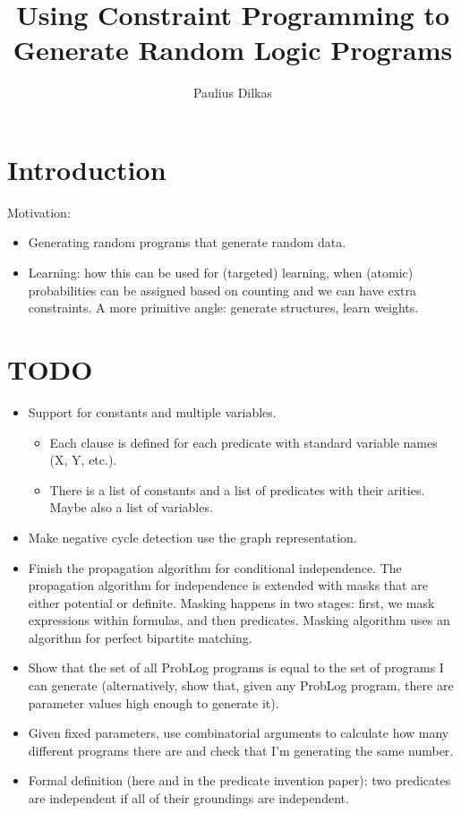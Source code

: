 \documentclass{article}
\author{Paulius Dilkas}
\title{Using Constraint Programming to Generate Random Logic Programs}
\begin{document}
\maketitle

\section{Introduction}

Motivation:
\begin{itemize}
\item Generating random programs that generate random data.
\item Learning: how this can be used for (targeted) learning, when (atomic)
  probabilities can be assigned based on counting and we can have extra
  constraints. A more primitive angle: generate structures, learn weights.
\end{itemize}

\section{TODO}

\begin{itemize}
\item Support for constants and multiple variables.
  \begin{itemize}
  \item Each clause is defined for each predicate with standard variable names
    (X, Y, etc.).
  \item There is a list of constants and a list of predicates with their
    arities. Maybe also a list of variables.
  \end{itemize}
\item Make negative cycle detection use the graph representation.
\item Finish the propagation algorithm for conditional independence. The
  propagation algorithm for independence is extended with masks that are either
  potential or definite. Masking happens in two stages: first, we mask
  expressions within formulas, and then predicates. Masking algorithm uses an
  algorithm for perfect bipartite matching.
\item Show that the set of all ProbLog programs is equal to the set of programs
  I can generate (alternatively, show that, given any ProbLog program, there are
  parameter values high enough to generate it).
\item Given fixed parameters, use combinatorial arguments to calculate how many
  different programs there are and check that I'm generating the same number.
\item Formal definition (here and in the predicate invention paper): two
  predicates are independent if all of their groundings are independent.
\end{itemize}
\end{document}
